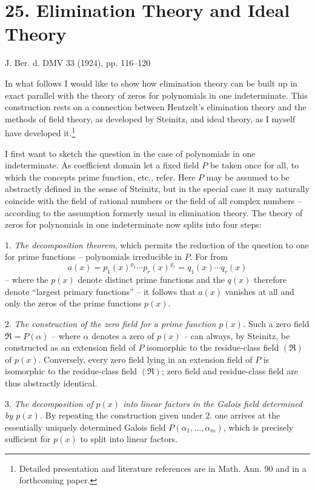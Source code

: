\section*{25. Elimination Theory and Ideal Theory}

\begin{center}
J. Ber. d. DMV 33 (1924), pp. 116--120
\end{center}

In what follows I would like to show how elimination theory can be built up in exact parallel with the theory of zeros for polynomials in one indeterminate. This construction rests on a connection between Hentzelt's elimination theory and the methods of field theory, as developed by Steinitz, and ideal theory, as I myself have developed it.\footnote{Detailed presentation and literature references are in Math. Ann. 90 and in a forthcoming paper.}

I first want to sketch the question in the case of polynomials in one indeterminate. As coefficient domain let a fixed field $P$ be taken once for all, to which the concepts prime function, etc., refer. Here $P$ may be assumed to be abstractly defined in the sense of Steinitz, but in the special case it may naturally coincide with the field of rational numbers or the field of all complex numbers -- according to the assumption formerly usual in elimination theory. The theory of zeros for polynomials in one indeterminate now splits into four steps:

1. \emph{The decomposition theorem}, which permits the reduction of the question to one for prime functions -- polynomials irreducible in $P$. For from
\[
 a(x)=p_1(x)^{\varrho_1}\cdots p_r(x)^{\varrho_r}=q_1(x)\cdots q_r(x)
\]
-- where the $p(x)$ denote distinct prime functions and the $q(x)$ therefore denote ``largest primary functions'' -- it follows that $a(x)$ vanishes at all and only the zeros of the prime functions $p(x)$.

2. \emph{The construction of the zero field for a prime function $p(x)$.} Such a zero field $\mathfrak R=P(\alpha)$ -- where $\alpha$ denotes a zero of $p(x)$ -- can always, by Steinitz, be constructed as an extension field of $P$ isomorphic to the residue-class field $(\mathfrak R)$ of $p(x)$. Conversely, every zero field lying in an extension field of $P$ is isomorphic to the residue-class field $(\mathfrak R)$; zero field and residue-class field are thus abstractly identical.

3. \emph{The decomposition of $p(x)$ into linear factors in the Galois field determined by $p(x)$.} By repeating the construction given under 2. one arrives at the essentially uniquely determined Galois field $P(\alpha_1,\ldots,\alpha_m)$, which is precisely sufficient for $p(x)$ to split into linear factors.

